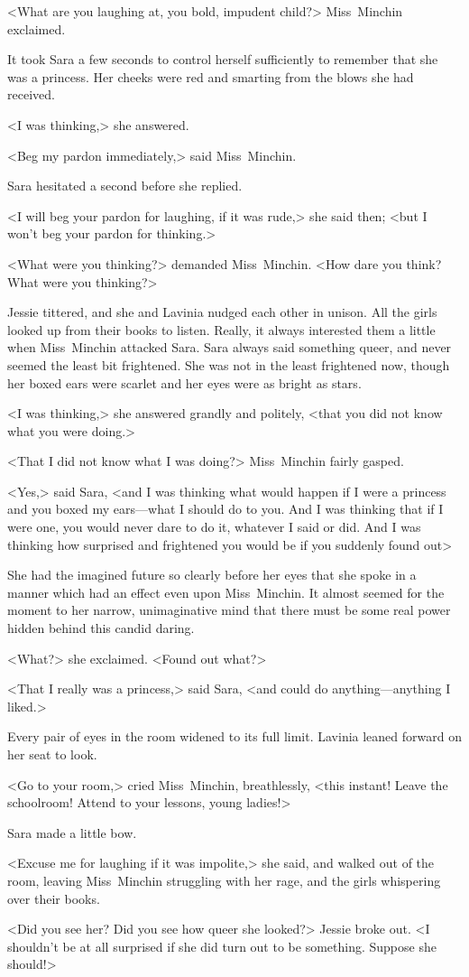 <What are you laughing at, you bold, impudent child?> Miss~Minchin exclaimed.

It took Sara a few seconds to control herself sufficiently to remember that she was a princess. Her cheeks were red and smarting from the blows she had received.

<I was thinking,> she answered.

<Beg my pardon immediately,> said Miss~Minchin.

Sara hesitated a second before she replied.

<I will beg your pardon for laughing, if it was rude,> she said then; <but I won't beg your pardon for thinking.>

<What were you thinking?> demanded Miss~Minchin. <How dare you think? What were you thinking?>

Jessie tittered, and she and Lavinia nudged each other in unison. All the girls looked up from their books to listen. Really, it always interested them a little when Miss~Minchin attacked Sara. Sara always said something queer, and never seemed the least bit frightened. She was not in the least frightened now, though her boxed ears were scarlet and her eyes were as bright as stars.

<I was thinking,> she answered grandly and politely, <that you did not know what you were doing.>

<That I did not know what I was doing?> Miss~Minchin fairly gasped.

<Yes,> said Sara, <and I was thinking what would happen if I were a princess and you boxed my ears—what I should do to you. And I was thinking that if I were one, you would never dare to do it, whatever I said or did. And I was thinking how surprised and frightened you would be if you suddenly found out\longdash>

She had the imagined future so clearly before her eyes that she spoke in a manner which had an effect even upon Miss~Minchin. It almost seemed for the moment to her narrow, unimaginative mind that there must be some real power hidden behind this candid daring.

<What?> she exclaimed. <Found out what?>

<That I really was a princess,> said Sara, <and could do anything—anything I liked.>

Every pair of eyes in the room widened to its full limit. Lavinia leaned forward on her seat to look.

<Go to your room,> cried Miss~Minchin, breathlessly, <this instant! Leave the schoolroom! Attend to your lessons, young ladies!>

Sara made a little bow.

<Excuse me for laughing if it was impolite,> she said, and walked out of the room, leaving Miss~Minchin struggling with her rage, and the girls whispering over their books.

<Did you see her? Did you see how queer she looked?> Jessie broke out. <I shouldn't be at all surprised if she did turn out to be something. Suppose she should!>

